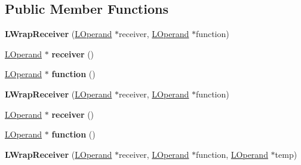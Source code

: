 \subsection*{Public Member Functions}
\begin{DoxyCompactItemize}
\item 
{\bfseries L\+Wrap\+Receiver} (\hyperlink{classv8_1_1internal_1_1_l_operand}{L\+Operand} $\ast$receiver, \hyperlink{classv8_1_1internal_1_1_l_operand}{L\+Operand} $\ast$function)\hypertarget{classv8_1_1internal_1_1_l_wrap_receiver_a24ab2d52e58cf666d31ead0c3d0df61d}{}\label{classv8_1_1internal_1_1_l_wrap_receiver_a24ab2d52e58cf666d31ead0c3d0df61d}

\item 
\hyperlink{classv8_1_1internal_1_1_l_operand}{L\+Operand} $\ast$ {\bfseries receiver} ()\hypertarget{classv8_1_1internal_1_1_l_wrap_receiver_ac4f23b016adecc0eec8dc29d7607f486}{}\label{classv8_1_1internal_1_1_l_wrap_receiver_ac4f23b016adecc0eec8dc29d7607f486}

\item 
\hyperlink{classv8_1_1internal_1_1_l_operand}{L\+Operand} $\ast$ {\bfseries function} ()\hypertarget{classv8_1_1internal_1_1_l_wrap_receiver_a95dc5af2b6137222026b758f3e4ad900}{}\label{classv8_1_1internal_1_1_l_wrap_receiver_a95dc5af2b6137222026b758f3e4ad900}

\item 
{\bfseries L\+Wrap\+Receiver} (\hyperlink{classv8_1_1internal_1_1_l_operand}{L\+Operand} $\ast$receiver, \hyperlink{classv8_1_1internal_1_1_l_operand}{L\+Operand} $\ast$function)\hypertarget{classv8_1_1internal_1_1_l_wrap_receiver_a24ab2d52e58cf666d31ead0c3d0df61d}{}\label{classv8_1_1internal_1_1_l_wrap_receiver_a24ab2d52e58cf666d31ead0c3d0df61d}

\item 
\hyperlink{classv8_1_1internal_1_1_l_operand}{L\+Operand} $\ast$ {\bfseries receiver} ()\hypertarget{classv8_1_1internal_1_1_l_wrap_receiver_ac4f23b016adecc0eec8dc29d7607f486}{}\label{classv8_1_1internal_1_1_l_wrap_receiver_ac4f23b016adecc0eec8dc29d7607f486}

\item 
\hyperlink{classv8_1_1internal_1_1_l_operand}{L\+Operand} $\ast$ {\bfseries function} ()\hypertarget{classv8_1_1internal_1_1_l_wrap_receiver_a95dc5af2b6137222026b758f3e4ad900}{}\label{classv8_1_1internal_1_1_l_wrap_receiver_a95dc5af2b6137222026b758f3e4ad900}

\item 
{\bfseries L\+Wrap\+Receiver} (\hyperlink{classv8_1_1internal_1_1_l_operand}{L\+Operand} $\ast$receiver, \hyperlink{classv8_1_1internal_1_1_l_operand}{L\+Operand} $\ast$function, \hyperlink{classv8_1_1internal_1_1_l_operand}{L\+Operand} $\ast$temp)\hypertarget{classv8_1_1internal_1_1_l_wrap_receiver_ae6268c10afa00ced369a515c342138c6}{}\label{classv8_1_1internal_1_1_l_wrap_receiver_ae6268c10afa00ced369a515c342138c6}


\end{DoxyCompactItemize}
